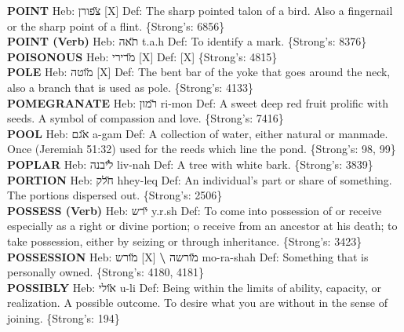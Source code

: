 {\textbf{POINT} Heb: {\large\H צפורן} {[}X{]} Def: The sharp pointed talon of a bird. Also a fingernail or the sharp point of a flint. \{Strong's: 6856\}\hfill{}\\

\textbf{POINT (Verb)} Heb: {\large\H תאה} t.a.h Def: To identify a mark. \{Strong's: 8376\}\hfill{}\\

\textbf{POISONOUS} Heb: {\large\H מרירי} {[}X{]} Def: {[}X{]} \{Strong's: 4815\}\hfill{}\\

\textbf{POLE} Heb: {\large\H מוטה} {[}X{]} Def: The bent bar of the yoke that goes around the neck, also a branch that is used as pole. \{Strong's: 4133\}\hfill{}\\

\textbf{POMEGRANATE} Heb: {\large\H רמון} ri-mon Def: A sweet deep red fruit prolific with seeds. A symbol of compassion and love. \{Strong's: 7416\}\hfill{}\\

\textbf{POOL} Heb: {\large\H אגם} a-gam Def: A collection of water, either natural or manmade. Once (Jeremiah 51:32) used for the reeds which line the pond. \{Strong's: 98, 99\}\hfill{}\\

\textbf{POPLAR} Heb: {\large\H ליבנה} liv-nah Def: A tree with white bark. \{Strong's: 3839\}\hfill{}\\

\textbf{PORTION} Heb: {\large\H חלק} hhey-leq Def: An individual’s part or share of something. The portions dispersed out. \{Strong's: 2506\}\hfill{}\\

\textbf{POSSESS (Verb)} Heb: {\large\H ירש} y.r.sh Def: To come into possession of or receive especially as a right or divine portion; o receive from an ancestor at his death; to take possession, either by seizing or through inheritance. \{Strong's: 3423\}\hfill{}\\

\textbf{POSSESSION} Heb: {\large\H מורש} {[}X{]} \textbf{\textbackslash{}} {\large\H מורשה} mo-ra-shah Def: Something that is personally owned. \{Strong's: 4180, 4181\}\hfill{}\\

\textbf{POSSIBLY} Heb: {\large\H אולי} u-li Def: Being within the limits of ability, capacity, or realization. A possible outcome. To desire what you are without in the sense of joining. \{Strong's: 194\}\hfill{}\\

}
